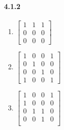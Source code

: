 \documentclass[11pt, letterpaper, twocolumn, fleqn]{article}
\begin{document}
    \paragraph{4.1.2}    
        \begin{enumerate}
            \item 
                $\begin{bmatrix}
                    1 & 1 & 1 \\
                    0 & 0 & 0 \\
                    0 & 0 & 0
                \end{bmatrix}$
            \addtocounter{enumi}{3}
            \item 
                $\begin{bmatrix}
                    1 & 0 & 0 & 1 \\
                    0 & 1 & 0 & 0 \\
                    0 & 0 & 1 & 0 \\
                    1 & 0 & 0 & 1
                \end{bmatrix}$
            \item 
                $\begin{bmatrix}
                    1 & 0 & 0 & 1 \\
                    1 & 0 & 0 & 0 \\
                    0 & 1 & 1 & 0 \\
                    0 & 0 & 1 & 0 \\
                \end{bmatrix}$
        \end{enumerate}
\end{document}
